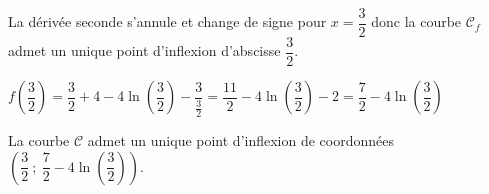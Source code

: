 \documentclass[10pt]{article}
\begin{document}
\begin{enumerate}
La dérivée seconde s'annule et change de signe pour $x=\dfrac{3}{2}$ donc la courbe $\mathcal{C}_f$ admet un unique point d'inflexion d'abscisse $\dfrac{3}{2}$.

$f\left (\dfrac{3}{2}\right) = \dfrac{3}{2} +4 -4\ln\left (\dfrac{3}{2}\right ) -\dfrac{3}{\frac{3}{2}}
= \dfrac{11}{2} -4\ln\left (\dfrac{3}{2}\right ) -2
= \dfrac{7}{2} -4\ln\left (\dfrac{3}{2}\right ) $

La courbe $\mathcal{C}$ admet un unique point d'inflexion de coordonnées
$\left ( \dfrac{3}{2}~;~\dfrac{7}{2} -4\ln\left (\dfrac{3}{2}\right )\right )$.
 
\end{enumerate}
\end{document}

